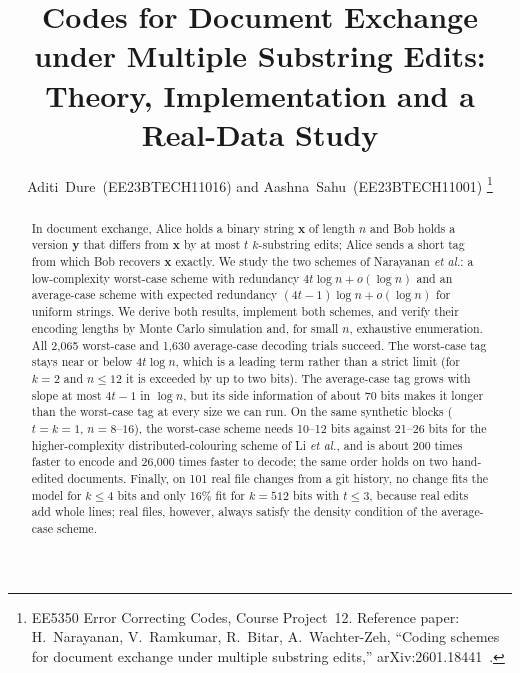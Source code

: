 \documentclass[journal,10pt]{IEEEtran}
\newcommand{\bx}{\mathbf{x}}
\newcommand{\by}{\mathbf{y}}
\begin{document}
\title{Codes for Document Exchange under Multiple Substring Edits:\\ Theory, Implementation and a Real-Data Study}

\author{Aditi~Dure~(EE23BTECH11016) and Aashna~Sahu~(EE23BTECH11001)%
\thanks{EE5350 Error Correcting Codes, Course Project~12. Reference paper: H.~Narayanan, V.~Ramkumar, R.~Bitar, A.~Wachter-Zeh, ``Coding schemes for document exchange under multiple substring edits,'' arXiv:2601.18441~\cite{narayanan}.}}


\maketitle

\begin{abstract}
In document exchange, Alice holds a binary string $\bx$ of length $n$ and Bob holds a version $\by$ that differs from $\bx$ by at most $t$ $k$-substring edits; Alice sends a short tag from which Bob recovers $\bx$ exactly. We study the two schemes of Narayanan \emph{et al.}: a low-complexity worst-case scheme with redundancy $4t\log n+o(\log n)$ and an average-case scheme with expected redundancy $(4t-1)\log n+o(\log n)$ for uniform strings. We derive both results, implement both schemes, and verify their encoding lengths by Monte Carlo simulation and, for small $n$, exhaustive enumeration. All 2{,}065 worst-case and 1{,}630 average-case decoding trials succeed. The worst-case tag stays near or below $4t\log n$, which is a leading term rather than a strict limit (for $k=2$ and $n\le12$ it is exceeded by up to two bits). The average-case tag grows with slope at most $4t-1$ in $\log n$, but its side information of about 70 bits makes it longer than the worst-case tag at every size we can run. On the same synthetic blocks ($t=k=1$, $n=8$--$16$), the worst-case scheme needs 10--12 bits against 21--26 bits for the higher-complexity distributed-colouring scheme of Li \emph{et al.}, and is about 200 times faster to encode and 26{,}000 times faster to decode; the same order holds on two hand-edited documents. Finally, on 101 real file changes from a git history, no change fits the model for $k\le4$ bits and only 16\% fit for $k=512$ bits with $t\le3$, because real edits add whole lines; real files, however, always satisfy the density condition of the average-case scheme.
\end{abstract}
\end{document}
